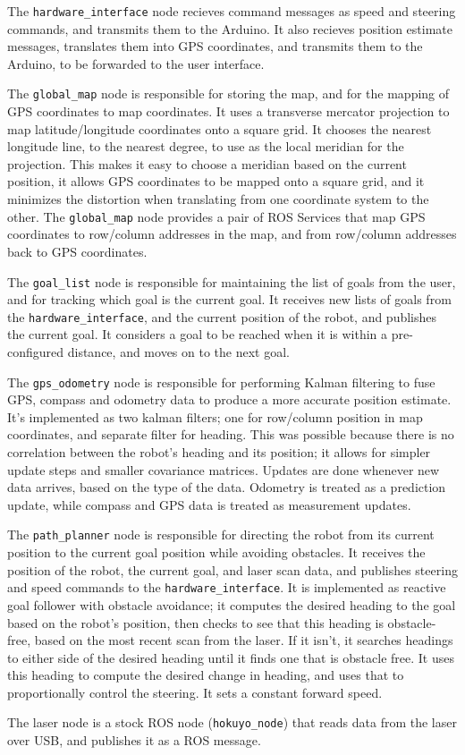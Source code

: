 The \texttt{hardware\_interface} node recieves command messages as speed and steering commands, and transmits them to the Arduino. It also recieves position estimate messages, translates them into GPS coordinates, and transmits them to the Arduino, to be forwarded to the user interface.

The \texttt{global\_map} node is responsible for storing the map, and for the mapping of GPS coordinates to map coordinates. It uses a transverse mercator projection to map latitude/longitude coordinates onto a square grid. It chooses the nearest longitude line, to the nearest degree, to use as the local meridian for the projection. This makes it easy to choose a meridian based on the current position, it allows GPS coordinates to be mapped onto a square grid, and it minimizes the distortion when translating from one coordinate system to the other. The \texttt{global\_map} node provides a pair of ROS Services that map GPS coordinates to row/column addresses in the map, and from row/column addresses back to GPS coordinates.

The \texttt{goal\_list} node is responsible for maintaining the list of goals from the user, and for tracking which goal is the current goal. It receives new lists of goals from the \texttt{hardware\_interface}, and the current position of the robot, and publishes the current goal. It considers a goal to be reached when it is within a pre-configured distance, and moves on to the next goal.

The \texttt{gps\_odometry} node is responsible for performing Kalman filtering to fuse GPS, compass and odometry data to produce a more accurate position estimate. It's implemented as two kalman filters; one for row/column position in map coordinates, and separate filter for heading. This was possible because there is no correlation between the robot's heading and its position; it allows for simpler update steps and smaller covariance matrices. Updates are done whenever new data arrives, based on the type of the data. Odometry is treated as a prediction update, while compass and GPS data is treated as measurement updates.

The \texttt{path\_planner} node is responsible for directing the robot from its current position to the current goal position while avoiding obstacles. It receives the position of the robot, the current goal, and laser scan data, and publishes steering and speed commands to the \texttt{hardware\_interface}. It is implemented as reactive goal follower with obstacle avoidance; it computes the desired heading to the goal based on the robot's position, then checks to see that this heading is obstacle-free, based on the most recent scan from the laser. If it isn't, it searches headings to either side of the desired heading until it finds one that is obstacle free. It uses this heading to compute the desired change in heading, and uses that to proportionally control the steering. It sets a constant forward speed.

The laser node is a stock ROS node (\texttt{hokuyo\_node}) that reads data from the laser over USB, and publishes it as a ROS message.
